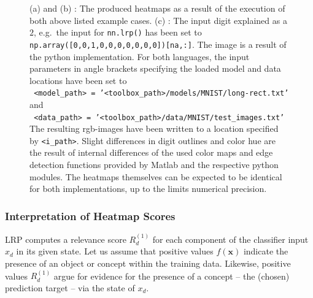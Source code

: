 \documentclass[a4wide]{article}
\newcommand{\x}{\boldsymbol{x}}
\begin{document}
\begin{figure}[h]
\centering
{}
\hspace{0.11\textwidth}
\hspace{0.11\textwidth}
\caption{(a) and (b) : The produced heatmaps as a result of the execution of both above listed example cases. (c) : The input digit explained as a $2$, e.g.~the input for \texttt{nn.lrp()} has been set to \texttt{np.array([0,0,1,0,0,0,0,0,0,0])[na,:]}. The image is a result of the python implementation.  For both languages, the input parameters in angle brackets specifying the loaded model and data locations have been set to\\
\texttt{ <model\_path> = '<toolbox\_path>/models/MNIST/long-rect.txt'} and\\
\texttt{ <data\_path> =  '<toolbox\_path>/data/MNIST/test\_images.txt'}\\
The resulting rgb-images have been written to a location specified by \texttt{<i\_path>}.
Slight differences in digit outlines and color hue are the result of internal differences of the used color maps and edge detection functions provided by Matlab and the respective python modules. The heatmaps themselves can be expected to be identical for both implementations, up to the limits numerical precision.}
\label{fig:example}
\end{figure}

\subsubsection*{Interpretation of Heatmap Scores}
LRP computes a relevance score $R_d^{(1)}$ for each component of the classifier input $x_d$ in its given state. Let us assume that positive values $f(\x)$ indicate the presence of an object or concept within the training data.
Likewise, positive values $R_d^{(1)}$ argue for evidence for the presence of a concept -- the (chosen) prediction target -- via the state of $x_d$. 
\end{document}

